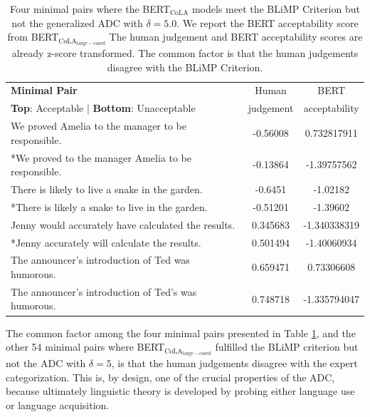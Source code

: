 \begin{table}[h]
    \centering
    \begin{tabular}{@{}lcc@{}}
    \toprule
    \textbf{Minimal Pair} & Human & BERT\\
    \textbf{Top}: Acceptable | \textbf{Bottom}: Unacceptable & judgement & acceptability\\
    \toprule
    We proved Amelia to the manager to be responsible.  & -0.56008 & 0.732817911 \\
    *We proved to the manager Amelia to be responsible. & -0.13864 & -1.39757562 \\
    \midrule
    There is likely to live a snake in the garden. & -0.6451 & -1.02182 \\
    *There is likely a snake to live in the garden.   &  -0.51201 & -1.39602 \\
    \midrule
    Jenny would accurately have calculated the results. & 0.345683 & -1.340338319 \\
    *Jenny accurately will calculate the results.  & 0.501494 & -1.40060934 \\
    \midrule
    The announcer's introduction of Ted was humorous.  & 0.659471 & 0.73306608 \\
    The announcer's introduction of Ted's was humorous. & 0.748718 & -1.335794047 \\
    \bottomrule
    \end{tabular}
    \caption[Four minimal pairs where the BLiMP Criterion and \newline ADC with $\delta=5.0$ differ]{Four minimal pairs where the BERT$_\mathrm{CoLA}$ models meet the BLiMP Criterion but not the generalized ADC with $\delta=5.0$. We report the BERT acceptability score from BERT$_\mathrm{CoLA_{large-cased}}$ The human judgement and BERT acceptability scores are already z-score transformed.  The common factor is that the human judgements disagree with the BLiMP Criterion.}
    \label{tab:table_10}
\end{table}

The common factor among the four minimal pairs presented in Table \ref{tab:table_10}, and the other 54 minimal pairs where BERT$_\mathrm{CoLA_{large-cased}}$ fulfilled the BLiMP criterion but not the ADC with $\delta=5$, is that the human judgements disagree with the expert categorization.  This is, by design, one of the crucial properties of the ADC, because ultimately linguistic theory is developed by probing either language use or language acquisition.  

